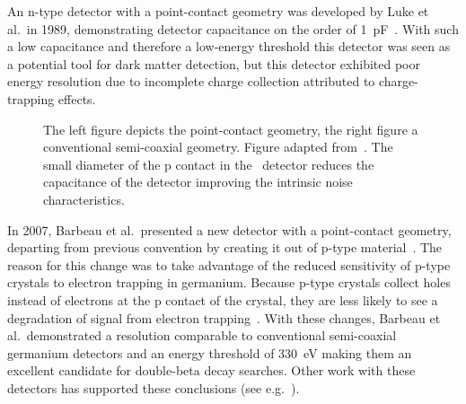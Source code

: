 An n-type detector with a point-contact geometry was developed by Luke et
al.~in 1989, demonstrating detector capacitance on the order of
1~pF~\cite{Luke89}.  With such a low capacitance and therefore a low-energy
threshold this detector was seen as a potential tool for dark matter detection, but this detector 
exhibited poor energy resolution due to incomplete charge collection attributed to charge-trapping effects.  
		\begin{figure}
			\centering
			\caption[Ge detector geometry comparison: \ppc~and semi-coax.]{The left figure depicts the point-contact geometry, the right figure a conventional 
			         semi-coaxial geometry.  Figure adapted from~\cite{Luke89}.  The small diameter of the p contact in the
			          \ppc~detector reduces the capacitance of the detector improving the intrinsic noise characteristics.}
			\label{fig:PPCGeom}
		\end{figure}
  In 2007, Barbeau et al.~presented a new detector with a point-contact 
geometry, departing from previous convention by creating it out
of p-type material~\cite{Barb07}.  The reason for this
change was to take advantage of the reduced sensitivity of p-type crystals to electron trapping in germanium.  
Because p-type crystals collect holes instead of electrons at the p contact of the crystal, they are less likely to 
see a degradation of signal from electron trapping~\cite{Hull:2005p2207}.
With these changes, Barbeau et al.~demonstrated
a resolution comparable to conventional semi-coaxial germanium detectors and
an energy threshold of 330~eV making them an excellent candidate for double-beta decay searches.  
Other work with these detectors has supported these conclusions (see e.g.~\cite{Hull:2008p2206,Aalseth:2008aa}).


